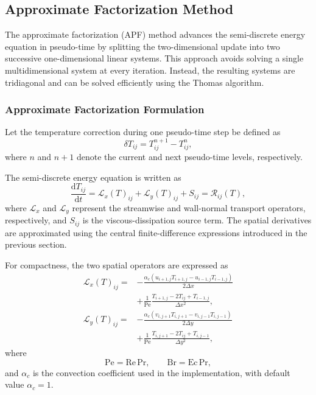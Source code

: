 \subsection{Approximate Factorization Method}
\label{subsec:apf}

The approximate factorization (APF) method advances the
semi-discrete energy equation in pseudo-time by splitting the
two-dimensional update into two successive one-dimensional
linear systems. This approach avoids solving a single
multidimensional system at every iteration. Instead, the
resulting systems are tridiagonal and can be solved efficiently
using the Thomas algorithm.

\subsubsection{Approximate Factorization Formulation}

Let the temperature correction during one pseudo-time step be
defined as
\begin{equation}
\delta T_{ij}
=
T_{ij}^{n+1}-T_{ij}^{n},
\label{eq:apf_temperature_correction}
\end{equation}
where $n$ and $n+1$ denote the current and next pseudo-time
levels, respectively.

The semi-discrete energy equation is written as
\begin{equation}
\frac{\mathrm{d}T_{ij}}{\mathrm{d}t}
=
\mathcal{L}_x(T)_{ij}
+
\mathcal{L}_y(T)_{ij}
+
S_{ij}
=
\mathcal{R}_{ij}(T),
\label{eq:apf_residual}
\end{equation}
where $\mathcal{L}_x$ and $\mathcal{L}_y$ represent the
streamwise and wall-normal transport operators, respectively,
and $S_{ij}$ is the viscous-dissipation source term. The
spatial derivatives are approximated using the central
finite-difference expressions introduced in the previous section.

For compactness, the two spatial operators are expressed as
\begin{align}
\mathcal{L}_x(T)_{ij}
={}&
-\frac{
\alpha_c
\left(
u_{i+1,j}T_{i+1,j}
-u_{i-1,j}T_{i-1,j}
\right)
}{2\Delta x}
\nonumber\\
&+
\frac{1}{\mathrm{Pe}}
\frac{
T_{i+1,j}-2T_{ij}+T_{i-1,j}
}{\Delta x^2},
\label{eq:apf_x_operator}
\\[0.25cm]
\mathcal{L}_y(T)_{ij}
={}&
-\frac{
\alpha_c
\left(
v_{i,j+1}T_{i,j+1}
-v_{i,j-1}T_{i,j-1}
\right)
}{2\Delta y}
\nonumber\\
&+
\frac{1}{\mathrm{Pe}}
\frac{
T_{i,j+1}-2T_{ij}+T_{i,j-1}
}{\Delta y^2},
\label{eq:apf_y_operator}
\end{align}
where
\begin{equation}
\mathrm{Pe}=\mathrm{Re}\,\mathrm{Pr},
\qquad
\mathrm{Br}=\mathrm{Ec}\,\mathrm{Pr},
\end{equation}
and $\alpha_c$ is the convection coefficient used in the
implementation, with default value $\alpha_c=1$.

